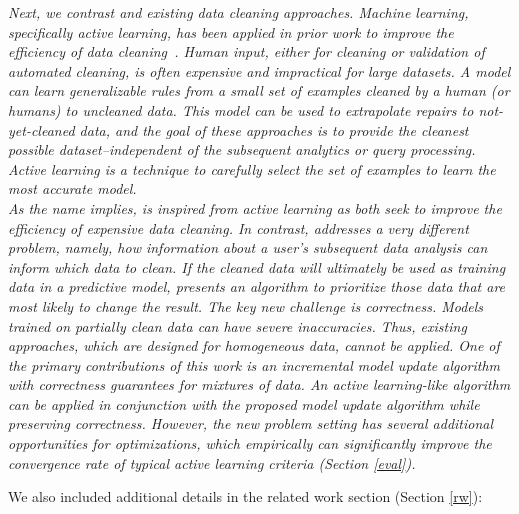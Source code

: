 \emph{Next, we contrast \sys and existing data cleaning approaches.
Machine learning, specifically active learning, has been applied in prior work to improve the efficiency of data cleaning~\cite{yakout2013don,DBLP:journals/pvldb/YakoutENOI11,gokhale2014corleone}.
Human input, either for cleaning or validation of automated cleaning, is often expensive and impractical for large datasets.
A model can learn generalizable rules from a small set of examples cleaned by a human (or humans) to uncleaned data.
This model can be used to extrapolate repairs to not-yet-cleaned data, and the goal of these approaches is to provide the cleanest possible dataset--independent of the subsequent analytics or query processing.
Active learning is a technique to carefully select the set of examples to learn the most accurate model.\\
As the name implies, \sys is inspired from active learning as both seek to improve the efficiency of expensive data cleaning.
In contrast, \sys addresses a very different problem, namely, how information about a user's subsequent data analysis can inform which data to clean.
If the cleaned data will ultimately be used as training data in a predictive model, \sys presents an algorithm to prioritize those data that are most likely to change the result.
The key new challenge is correctness.
Models trained on partially clean data can have severe inaccuracies.
Thus, existing approaches, which are designed for homogeneous data, cannot be applied.
One of the primary contributions of this work is an incremental model update algorithm with correctness guarantees for mixtures of data.
An active learning-like algorithm can be applied in conjunction with the proposed model update algorithm while preserving correctness.
However, the new problem setting has several additional opportunities for optimizations, which empirically can significantly improve the convergence rate of typical active learning criteria (Section \ref{eval}).}

\vspace{0.5em}

We also included additional details in the related work section (Section \ref{rw}):

